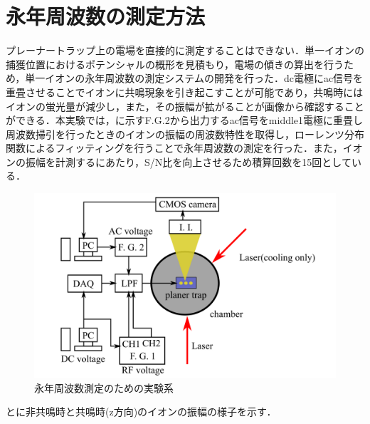 \clearpage

\section{永年周波数の測定方法} \label{MeasSecFreq_Method}
プレーナートラップ上の電場を直接的に測定することはできない．単一イオンの捕獲位置におけるポテンシャルの概形を見積もり，電場の傾きの算出を行うため，単一イオンの永年周波数の測定システムの開発を行った．dc電極にac信号を重畳させることでイオンに共鳴現象を引き起こすことが可能であり，共鳴時にはイオンの蛍光量が減少し，また，その振幅が拡がることが画像から確認することができる．本実験では，に示すF.G.2から出力するac信号をmiddle1電極に重畳し周波数掃引を行ったときのイオンの振幅の周波数特性を取得し，ローレンツ分布関数によるフィッティングを行うことで永年周波数の測定を行った．また，イオンの振幅を計測するにあたり，S/N比を向上させるため積算回数を15回としている．

\begin{figure}[h]
	\centering
	\includegraphics[width = 0.6\linewidth]{./methods/figure/SecularFreqMeasSetup.png}
	\caption{永年周波数測定のための実験系}
	\label{fig:MeasSec_System}
\end{figure}

とに非共鳴時と共鳴時(z方向)のイオンの振幅の様子を示す．

